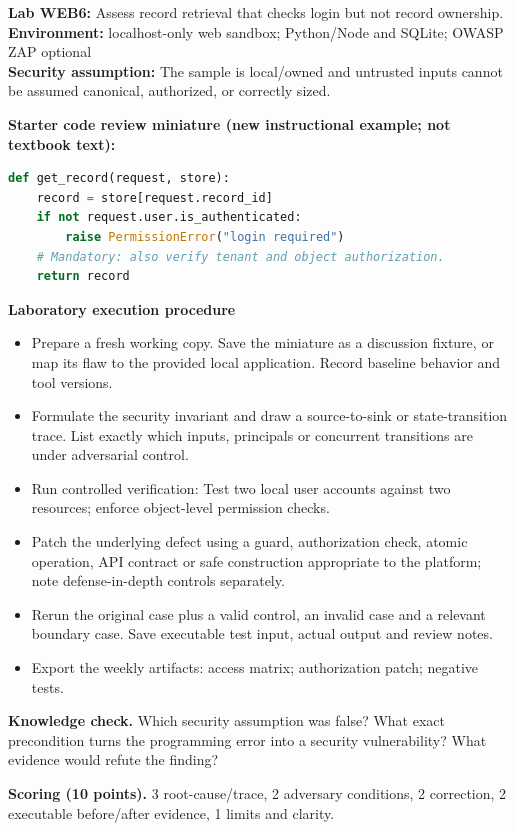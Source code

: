 \documentclass[10pt,letterpaper]{article}
\begin{document}
\begin{insight}\textbf{Lab WEB6:} Assess record retrieval that checks login but not record ownership.\\\textbf{Environment:} localhost-only web sandbox; Python/Node and SQLite; OWASP ZAP optional\\\textbf{Security assumption:} The sample is local/owned and untrusted inputs cannot be assumed canonical, authorized, or correctly sized.\end{insight}
\textbf{Starter code review miniature (new instructional example; not textbook text):}
\begin{lstlisting}[language=Python]
def get_record(request, store):
    record = store[request.record_id]
    if not request.user.is_authenticated:
        raise PermissionError("login required")
    # Mandatory: also verify tenant and object authorization.
    return record
\end{lstlisting}
\textbf{Laboratory execution procedure}
\begin{itemize}[leftmargin=*,itemsep=2pt]
\item Prepare a fresh working copy. Save the miniature as a discussion fixture, or map its flaw to the provided local application. Record baseline behavior and tool versions.
\item Formulate the security invariant and draw a source-to-sink or state-transition trace. List exactly which inputs, principals or concurrent transitions are under adversarial control.
\item Run controlled verification: Test two local user accounts against two resources; enforce object-level permission checks.
\item Patch the underlying defect using a guard, authorization check, atomic operation, API contract or safe construction appropriate to the platform; note defense-in-depth controls separately.
\item Rerun the original case plus a valid control, an invalid case and a relevant boundary case. Save executable test input, actual output and review notes.
\item Export the weekly artifacts: access matrix; authorization patch; negative tests.
\end{itemize}
\textbf{Knowledge check.} Which security assumption was false? What exact precondition turns the programming error into a security vulnerability? What evidence would refute the finding?

\textbf{Scoring (10 points).} 3 root-cause/trace, 2 adversary conditions, 2 correction, 2 executable before/after evidence, 1 limits and clarity.
\end{document}
